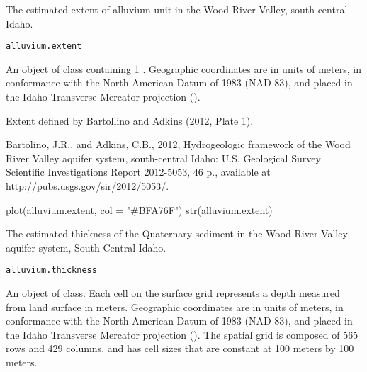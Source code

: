 \documentclass[letterpaper]{book}
\begin{document}
%
\begin{Description}\relax
The estimated extent of alluvium unit in the Wood River Valley, south-central Idaho.
\end{Description}
%
\begin{Usage}
\begin{verbatim}
alluvium.extent
\end{verbatim}
\end{Usage}
%
\begin{Format}
An object of  class containing 1 .
Geographic coordinates are in units of meters, in conformance with the North American Datum of 1983 (NAD 83), and placed in the
Idaho Transverse Mercator projection ().
\end{Format}
%
\begin{Source}\relax
Extent defined by Bartollino and Adkins (2012, Plate 1).
\end{Source}
%
\begin{References}\relax
Bartolino, J.R., and Adkins, C.B., 2012, Hydrogeologic framework of the Wood River Valley aquifer system, south-central Idaho: U.S. Geological Survey Scientific Investigations Report 2012-5053, 46 p., available at \url{http://pubs.usgs.gov/sir/2012/5053/}.
\end{References}
%
\begin{Examples}
\begin{ExampleCode}
plot(alluvium.extent, col = "#BFA76F")
str(alluvium.extent)
\end{ExampleCode}
\end{Examples}
%
\begin{Description}\relax
The estimated thickness of the Quaternary sediment in the Wood River Valley aquifer system, South-Central Idaho.
\end{Description}
%
\begin{Usage}
\begin{verbatim}
alluvium.thickness
\end{verbatim}
\end{Usage}
%
\begin{Format}
An object of  class.
Each cell on the surface grid represents a depth measured from land surface in meters.
Geographic coordinates are in units of meters, in conformance with the North American Datum of 1983 (NAD 83), and placed in the
Idaho Transverse Mercator projection ().
The spatial grid is composed of 565 rows and 429 columns, and has cell sizes that are constant at 100 meters by 100 meters.
\end{Format}
\end{document}
